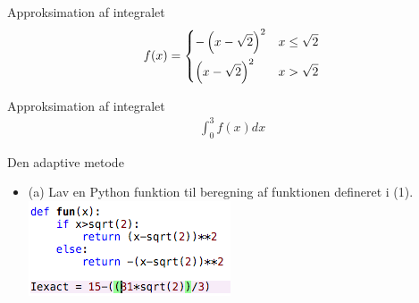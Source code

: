 %    

\begin{frame}{Approksimation af integralet}
\begin{align*}
f(x) = 
\begin{dcases}
- \left( x - \sqrt{2} \right)^2 & x \leq \sqrt{2}\\
\left( x - \sqrt{2} \right)^2 & x > \sqrt{2} \\
\end{dcases}
\end{align*} 
    
    Approksimation af integralet 
    \begin{align}
    \int_{0}^{3}f(x)dx    
    \end{align}
\end{frame}



\begin{frame}{Den adaptive metode}
    \begin{itemize}
        \item (a) Lav en Python funktion til beregning af funktionen defineret i (1).
        \includegraphics[]{images/1.4(a).png}
    \end{itemize}
\end{frame}


